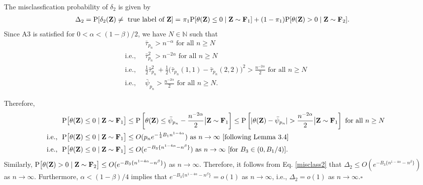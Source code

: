 \documentclass[twoside]{article}
\newcommand{\bZ}{\mathbf{Z}}
\newcommand{\bF}{\mathbf{F}}
\newcommand{\0}{\mathbf{0}}
\newcommand{\1}{\mathbf{1}}
\newcommand*{\QEDB}{\hfill\ensuremath{\square}}
\numberwithin{equation}{section}
\begin{document}

The misclassfication probability of $\delta_2$ is given by
\begin{align}\label{misclass2}
 \Delta_2 = {\rm P}[\delta_2(\bZ)\neq \text{ true label of }\bZ]
 =&\ \pi_1 {\rm P}[\theta(\bZ)\leq 0\mid \bZ\sim\bF_1]+ (1-\pi_1){\rm P}[\theta(\bZ)> 0\mid \bZ\sim\bF_2].
\end{align}
Since A3 is satisfied for $0<\alpha<(1-\beta)/2$, we have $N\in \mathbb{N}$ such that
\begin{align}\label{ref19}
 &\ \bar{\tau}_{p_n} > n^{-\alpha}\text{ for all }n\geq N\nonumber \\
 \text{i.e., }&\ \bar{\tau}^2_{p_n}> n^{-2\alpha}\text{ for all }n\geq N\nonumber \\
 \text{i.e., }&\ \frac{1}{2}\bar{\tau}^2_{p_n} + \frac{1}{2}\big (\bar{\tau}_{p_n}(1,1) - \bar{\tau}_{p_n}(2,2)\big )^2> \frac{n^{-2\alpha}}{2}\text{ for all }n\geq N\nonumber \\
 \text{i.e., }&\ \bar{\psi}_{p_n}> \frac{n^{-2\alpha}}{2}\text{ for all }n\geq N.
\end{align}

Therefore,
\begin{align*}
&\ {\rm P}\big [\theta(\bZ)\leq 0\mid \bZ\sim\bF_1\big ]\leq {\rm P}\left [\theta(\bZ)\leq \bar{\psi}_{p_n}-\frac{n^{-2\alpha}}{2} \big | \bZ\sim\bF_1\right ]\leq {\rm P}\left [|\theta(\bZ) - \bar{\psi}_{p_n}|>\frac{n^{-2\alpha}}{2}\big | \bZ\sim\bF_1\right ]\text{ for all }n\geq N\\
\text{i.e., }&\  {\rm P}\big [\theta(\bZ)\leq 0\mid \bZ\sim\bF_1\big ]\leq O(p_ne^{-\frac{1}{4}B_1n^{1-4\alpha}})\text{ as }n\to\infty\ [\text{following  Lemma }3.4]\\
\text{i.e., }&\  {\rm P}\big [\theta(\bZ)\leq 0\mid \bZ\sim\bF_1\big ]\leq O(e^{-B_3\{n^{1-4\alpha}- n^{\beta}\}})\text{ as }n\to\infty\ [\text{for }B_3\in (0,B_1/4)].
\end{align*}
Similarly, ${\rm P}\big [\theta(\bZ)> 0\mid \bZ\sim\bF_2\big ]
\leq O(e^{-B_3\{n^{1-4\alpha}- n^{\beta}\}})$ as $n\to\infty$. Therefore, it follows from Eq. \eqref{misclass2} that $\Delta_2\leq O(e^{-B_3\{n^{1-4\alpha}- n^{\beta}\}})$ as $n\to\infty$. Furthermore, $\alpha<(1-\beta)/4$ implies that $e^{-B_3\{n^{1-4\alpha} - n^\beta\}}=o(1)$ as $n\to\infty$, i.e., $\Delta_2=o(1)$ as $n\to\infty$.\hfill\QEDB\newline
\end{document}
